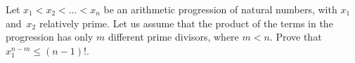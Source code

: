 \problem
Let $x_1 < x_2 < \ldots < x_n$ be an arithmetic progression of natural numbers, with $x_1$ and~$x_2$ relatively prime.
Let us assume that the product of the terms in the progression has only $m$ different prime divisors, where $m < n$.
Prove that $x_1^{n-m}\leq (n-1)!$.
\solution
\endproblem
